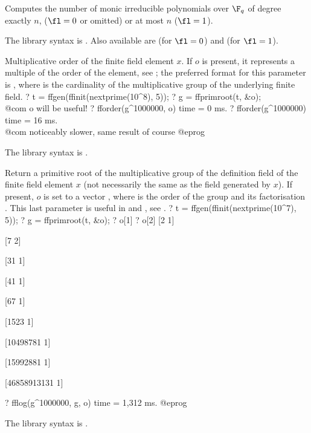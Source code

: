 \label{se:ffnbirred}
Computes the number of monic irreducible polynomials over $\F_q$ of degree exactly $n$,
($\fl=0$ or omitted) or at most $n$ ($\fl=1$).

The library syntax is .
Also available are
  (for $\fl=0$)
 and  (for $\fl=1$).

\label{se:fforder}
Multiplicative order of the finite field element $x$.  If $o$ is
present, it represents a multiple of the order of the element,
see ; the preferred format for
this parameter is \kbd{[N, factor(N)]}, where  is the cardinality
of the multiplicative group of the underlying finite field.
\bprog
? t = ffgen(ffinit(nextprime(10^8), 5));
? g = ffprimroot(t, &o);  \\@com o will be useful!
? fforder(g^1000000, o)
time = 0 ms.
? fforder(g^1000000)
time = 16 ms. \\@com noticeably slower, same result of course
@eprog

The library syntax is .

\label{se:ffprimroot}
Return a primitive root of the multiplicative
group of the definition field of the finite field element $x$ (not necessarily
the same as the field generated by $x$). If present, $o$ is set to
a vector \kbd{[ord, fa]}, where  is the order of the group
and  its factorisation . This last parameter is
useful in  and , see .
\bprog
? t = ffgen(ffinit(nextprime(10^7), 5));
? g = ffprimroot(t, &o);
? o[1]
? o[2]
[2 1]

[7 2]

[31 1]

[41 1]

[67 1]

[1523 1]

[10498781 1]

[15992881 1]

[46858913131 1]

? fflog(g^1000000, g, o)
time = 1,312 ms.
@eprog

The library syntax is .

